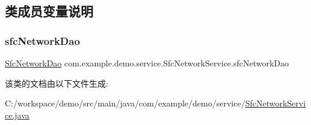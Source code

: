 \subsection{类成员变量说明}
\mbox{\label{classcom_1_1example_1_1demo_1_1service_1_1_sfc_network_service_ac0d840b41b77a05ac1662e012f274789}} 
\subsubsection{\texorpdfstring{sfc\+Network\+Dao}{sfcNetworkDao}}
{\footnotesize\ttfamily \mbox{\hyperlink{interfacecom_1_1example_1_1demo_1_1dao_1_1_sfc_network_dao}{Sfc\+Network\+Dao}} com.\+example.\+demo.\+service.\+Sfc\+Network\+Service.\+sfc\+Network\+Dao\hspace{0.3cm}{\ttfamily [package]}}



该类的文档由以下文件生成\+:\begin{DoxyCompactItemize}
\item 
C\+:/workspace/demo/src/main/java/com/example/demo/service/\mbox{\hyperlink{_sfc_network_service_8java}{Sfc\+Network\+Service.\+java}}\end{DoxyCompactItemize}
